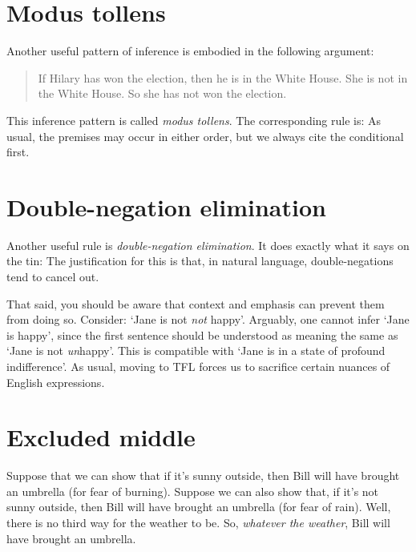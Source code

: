 \section{Modus tollens}
Another useful pattern of inference is embodied in the following argument:
	\begin{quote}
		If Hilary has won the election, then he is in the White House. She is not in the White House. So she has not won the election.
	\end{quote}
This inference pattern is called \emph{modus tollens}. The corresponding rule is:
As usual, the premises may occur in either order, but we always cite the conditional first. 

\section{Double-negation elimination}
Another useful rule is \emph{double-negation elimination}. It does exactly what it says on the tin:
The justification for this is that, in natural language, double-negations tend to cancel out. 

That said, you should be aware that context and emphasis can prevent them from doing so. Consider: `Jane is not \emph{not} happy'. Arguably, one cannot infer `Jane is happy', since the first sentence should be understood as meaning the same as  `Jane is not \emph{un}happy'. This is compatible with `Jane is in a state of profound indifference'. As usual, moving to TFL forces us to sacrifice certain nuances of English expressions.

\section{Excluded middle}

Suppose that we can show that if it's sunny outside, then Bill will have brought an umbrella (for fear of burning). Suppose we can also show that, if it's not sunny outside, then Bill will have brought an umbrella (for fear of rain). Well, there is no third way for the weather to be. So, \emph{whatever the weather}, Bill will have brought an umbrella. 

